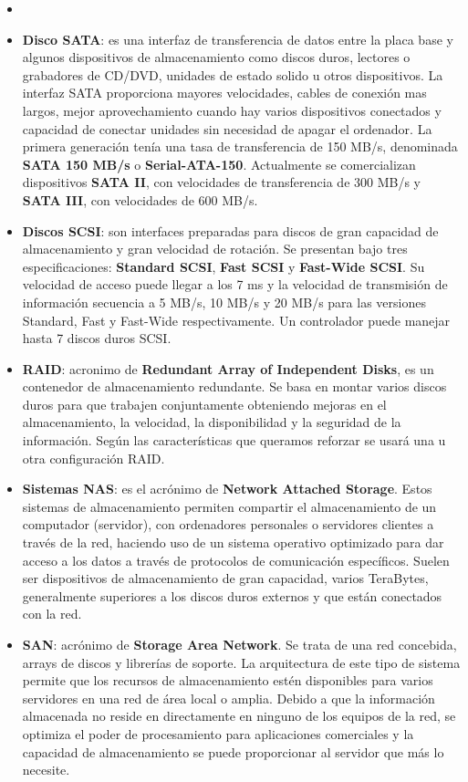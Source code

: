 \begin{itemize}
    \item \item \textbf{Disco SATA}: es una interfaz de transferencia de datos entre la placa base y algunos dispositivos de almacenamiento como discos duros, lectores o grabadores de CD/DVD, unidades de estado solido u otros dispositivos. La interfaz SATA proporciona mayores velocidades, cables de conexión mas largos, mejor aprovechamiento cuando hay varios dispositivos conectados y capacidad de conectar unidades sin necesidad de apagar el ordenador. La primera generación tenía una tasa de transferencia de 150 MB/s, denominada \textbf{SATA 150 MB/s} o \textbf{Serial-ATA-150}. Actualmente se comercializan dispositivos \textbf{SATA II}, con velocidades de transferencia de 300 MB/s y \textbf{SATA III}, con velocidades de 600 MB/s.

    \item \textbf{Discos SCSI}: son interfaces preparadas para discos de gran capacidad de almacenamiento y gran velocidad de rotación. Se presentan bajo tres especificaciones: \textbf{Standard SCSI}, \textbf{Fast SCSI} y \textbf{Fast-Wide SCSI}. Su velocidad de acceso puede llegar a los 7 ms y la velocidad de transmisión de información secuencia a 5 MB/s, 10 MB/s y 20 MB/s para las versiones Standard, Fast y Fast-Wide respectivamente. Un controlador puede manejar hasta 7 discos duros SCSI.

    \item \textbf{RAID}: acronimo de \textbf{Redundant Array of Independent Disks}, es un contenedor de almacenamiento redundante. Se basa en montar varios discos duros para que trabajen conjuntamente obteniendo mejoras en el almacenamiento, la velocidad, la disponibilidad y la seguridad de la información. Según las características que queramos reforzar se usará una u otra configuración RAID.

    \item \textbf{Sistemas NAS}: es el acrónimo de \textbf{Network Attached Storage}. Estos sistemas de almacenamiento permiten compartir el almacenamiento de un computador (servidor), con ordenadores personales o servidores clientes a través de la red, haciendo uso de un sistema operativo optimizado para dar acceso a los datos a través de protocolos de comunicación específicos. Suelen ser dispositivos de almacenamiento de gran capacidad, varios TeraBytes, generalmente superiores a los discos duros externos y que están conectados con la red.

    \item \textbf{SAN}: acrónimo de \textbf{Storage Area Network}. Se trata de una red concebida, arrays de discos y librerías de soporte. La arquitectura de este tipo de sistema permite que los recursos de almacenamiento estén disponibles para varios servidores en una red de área local o amplia. Debido a que la información almacenada no reside en directamente en ninguno de los equipos de la red, se optimiza el poder de procesamiento para aplicaciones comerciales y la capacidad de almacenamiento se puede proporcionar al servidor que más lo necesite.
\end{itemize}

